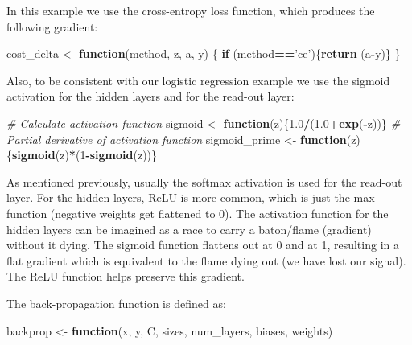 \documentclass[]{book}
\newenvironment{Shaded}{\begin{snugshade}}{\end{snugshade}}
\newcommand{\CommentTok}[1]{\textcolor[rgb]{0.56,0.35,0.01}{\textit{#1}}}
\newcommand{\ControlFlowTok}[1]{\textcolor[rgb]{0.13,0.29,0.53}{\textbf{#1}}}
\newcommand{\DecValTok}[1]{\textcolor[rgb]{0.00,0.00,0.81}{#1}}
\newcommand{\FloatTok}[1]{\textcolor[rgb]{0.00,0.00,0.81}{#1}}
\newcommand{\KeywordTok}[1]{\textcolor[rgb]{0.13,0.29,0.53}{\textbf{#1}}}
\newcommand{\NormalTok}[1]{#1}
\newcommand{\OperatorTok}[1]{\textcolor[rgb]{0.81,0.36,0.00}{\textbf{#1}}}
\newcommand{\StringTok}[1]{\textcolor[rgb]{0.31,0.60,0.02}{#1}}
\begin{document}
In this example we use the cross-entropy loss function, which produces the following gradient:

\begin{Shaded}
\begin{Highlighting}[]
\NormalTok{cost_delta <-}\StringTok{ }\ControlFlowTok{function}\NormalTok{(method, z, a, y) \{}
  \ControlFlowTok{if}\NormalTok{ (method}\OperatorTok{==}\StringTok{'ce'}\NormalTok{)\{}\KeywordTok{return}\NormalTok{ (a}\OperatorTok{-}\NormalTok{y)\}}
\NormalTok{\}}
\end{Highlighting}
\end{Shaded}

Also, to be consistent with our logistic regression example we use the sigmoid activation for the hidden layers and for the read-out layer:

\begin{Shaded}
\begin{Highlighting}[]
\CommentTok{# Calculate activation function}
\NormalTok{sigmoid <-}\StringTok{ }\ControlFlowTok{function}\NormalTok{(z)\{}\FloatTok{1.0}\OperatorTok{/}\NormalTok{(}\FloatTok{1.0}\OperatorTok{+}\KeywordTok{exp}\NormalTok{(}\OperatorTok{-}\NormalTok{z))\}}
\CommentTok{# Partial derivative of activation function}
\NormalTok{sigmoid_prime <-}\StringTok{ }\ControlFlowTok{function}\NormalTok{(z)\{}\KeywordTok{sigmoid}\NormalTok{(z)}\OperatorTok{*}\NormalTok{(}\DecValTok{1}\OperatorTok{-}\KeywordTok{sigmoid}\NormalTok{(z))\}}
\end{Highlighting}
\end{Shaded}

As mentioned previously, usually the softmax activation is used for the read-out layer. For the hidden layers, ReLU is more common, which is just the max function (negative weights get flattened to 0). The activation function for the hidden layers can be imagined as a race to carry a baton/flame (gradient) without it dying. The sigmoid function flattens out at 0 and at 1, resulting in a flat gradient which is equivalent to the flame dying out (we have lost our signal). The ReLU function helps preserve this gradient.

The back-propagation function is defined as:

\begin{Shaded}
\begin{Highlighting}[]
\NormalTok{backprop <-}\StringTok{ }\ControlFlowTok{function}\NormalTok{(x, y, C, sizes, num_layers, biases, weights)}
\end{Highlighting}
\end{Shaded}
\end{document}
